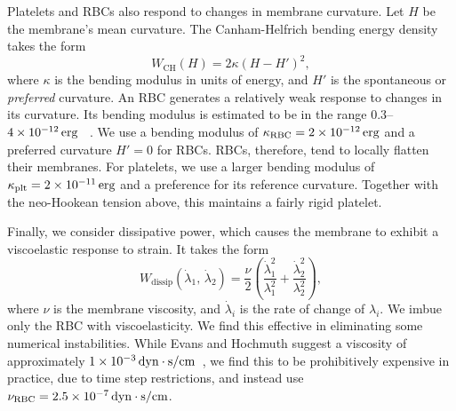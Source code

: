 Platelets and RBCs also respond to changes in membrane curvature. Let $H$ be the
membrane's mean curvature. The Canham-Helfrich bending energy density takes the form~%
\cite{Canham:1970wx}
\begin{equation}\label{eq:bending-energy}
    W_\text{CH}(H) = 2\kappa {(H-H')}^2,
\end{equation}
where $\kappa$ is the bending modulus in units of energy, and $H'$ is the spontaneous or
\emph{preferred} curvature. An RBC generates a relatively weak response to changes in its
curvature. Its bending modulus is estimated to be in the range $0.3$--$4\sci{-12}\erg$~%
\cite{Mohandas:1994tg}. We use a bending modulus of $\rbc\kappa = 2\sci{-12}\erg$ and a
preferred curvature $H' = 0$ for RBCs. RBCs, therefore, tend to locally flatten their
membranes. For platelets, we use a larger bending modulus of $\plt\kappa=2\sci{-11}\erg$
and a preference for its reference curvature. Together with the neo-Hookean tension
above, this maintains a fairly rigid platelet.

Finally, we consider dissipative power, which causes the membrane to exhibit a
viscoelastic response to strain. It takes the form~\cite{Rangamani:2012hi}
\begin{equation}\label{eq:dissip-energy}
    W_\text{dissip}(\dot{\lambda}_1,\,\dot{\lambda}_2) = \frac{\nu}{2}\left(\frac{\dot{\lambda}_1^2}{\lambda_1^2} + \frac{\dot{\lambda}_2^2}{\lambda_2^2}\right),
\end{equation}
where $\nu$ is the membrane viscosity, and $\dot{\lambda}_i$ is the rate of change of
$\lambda_i$. We imbue only the RBC with viscoelasticity. We find this effective in
eliminating some numerical instabilities. While Evans and Hochmuth suggest a viscosity of
approximately $1\sci{-3}\dynsecpercm$~\cite{Evans:1976tx}, we find this to be
prohibitively expensive in practice, due to time step restrictions, and instead use
$\rbc\nu = 2.5\sci{-7}\dynsecpercm$.

